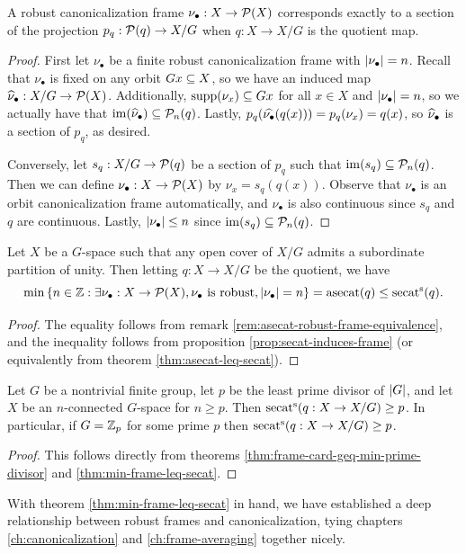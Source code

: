 \begin{remark}\label{rem:asecat-robust-frame-equivalence}
    A robust canonicalization frame $\nu_\bullet : X \to \PP(X)$ corresponds exactly to a section of the projection $p_q : \PP(q) \to X/G$ when $q : X \to X/G$ is the quotient map.
    \begin{proof}
        First let $\nu_\bullet$ be a finite robust canonicalization frame with $\card{\nu_\bullet} = n$.
        Recall that $\nu_\bullet$ is fixed on any orbit $Gx \sub X$, so we have an induced map $\Hat{\nu}_\bullet : X/G \to \PP(X)$.
        Additionally, $\supp (\nu_x) \sub Gx$ for all $x \in X$ and $\card{\nu_\bullet} = n$, so we actually have that $\im (\Hat{\nu}_\bullet) \sub \PP_n(q)$.
        Lastly, $p_q(\Hat{\nu_\bullet}(q(x))) = p_q(\nu_x) = q(x)$, so $\Hat{\nu}_\bullet$ is a section of $p_q$, as desired.

        Conversely, let $s_q : X/G \to \PP(q)$ be a section of $p_q$ such that $\im(s_q) \sub \PP_n(q)$.
        Then we can define $\nu_\bullet : X \to \PP(X)$ by $\nu_x = s_q (q(x))$.
        Observe that $\nu_\bullet$ is an orbit canonicalization frame automatically, and $\nu_\bullet$ is also continuous since $s_q$ and $q$ are continuous.
        Lastly, $\card{\nu_\bullet} \leq n$ since $\im(s_q) \sub \PP_n(q)$.
        

    \end{proof}
\end{remark}


\begin{theorem}\label{thm:min-frame-leq-secat}
    Let $X$ be a $G$-space such that any open cover of $X/G$ admits a subordinate partition of unity.
    Then letting $q : X \to X/G$ be the quotient, we have
    \[
        \min\set{n \in \Z : \exists \nu_\bullet : X \to \PP(X), \nu_\bullet \text{ is robust}, \card{\nu_\bullet} = n}
        = \asecat(q)
        \leq \ssecat(q).
    \]
    \begin{proof}
        The equality follows from remark \ref{rem:asecat-robust-frame-equivalence}, and the inequality follows from proposition \ref{prop:secat-induces-frame} (or equivalently from theorem \ref{thm:asecat-leq-secat}).
    \end{proof}
\end{theorem}


\begin{corollary}
    Let $G$ be a nontrivial finite group, let $p$ be the least prime divisor of $\card{G}$, and let $X$ be an $n$-connected $G$-space for $n \geq p$.
    Then $\ssecat(q : X \to X/G) \geq p$.
    In particular, if $G = \Z_p$ for some prime $p$ then $\ssecat(q : X \to X/G) \geq p$.
    \begin{proof}
        This follows directly from theorems \ref{thm:frame-card-geq-min-prime-divisor} and \ref{thm:min-frame-leq-secat}.
    \end{proof}
\end{corollary}


With theorem \ref{thm:min-frame-leq-secat} in hand, we have established a deep relationship between robust frames and canonicalization, tying chapters \ref{ch:canonicalization} and \ref{ch:frame-averaging} together nicely.
